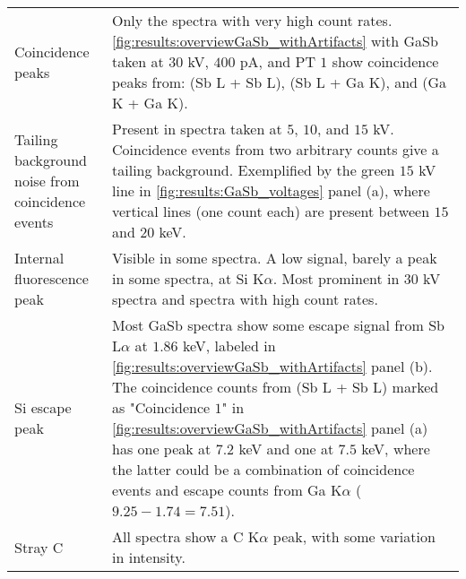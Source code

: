 \begin{table}[phtb]
\begin{center}
\begin{tabular}{p{3.5cm}p{11.1cm}}
			Coincidence peaks                                & Only the spectra with very high count rates. \cref{fig:results:overviewGaSb_withArtifacts} with GaSb taken at $30$ kV, $400$ pA, and PT $1$ show coincidence peaks from: (Sb L + Sb L), (Sb L + Ga K), and (Ga K + Ga K).                                                                                                                                                                                                                                 \\
			Tailing background noise from coincidence events & Present in spectra taken at $5$, $10$, and $15$ kV. Coincidence events from two arbitrary counts give a tailing background. Exemplified by the green $15$ kV line in \cref{fig:results:GaSb_voltages} panel (a), where vertical lines (one count each) are present between $15$ and $20$ keV.                                                                                                                                                             \\
			Internal fluorescence peak                       & Visible in some spectra. A low signal, barely a peak in some spectra, at Si K$\alpha$. Most prominent in $30$ kV spectra and spectra with high count rates.                                                                                                                                                                                                                                                                                               \\
			Si escape peak                                   & Most GaSb spectra show some escape signal from Sb L$\alpha$ at $1.86$ keV, labeled in \cref{fig:results:overviewGaSb_withArtifacts} panel (b). The coincidence counts from (Sb L + Sb L) marked as "Coincidence $1$" in \cref{fig:results:overviewGaSb_withArtifacts} panel (a) has one peak at $7.2$ keV and one at $7.5$ keV, where the latter could be a combination of coincidence events and escape counts from Ga K$\alpha$ ($9.25 - 1.74 = 7.51$). \\
			Stray C                                          & All spectra show a C K$\alpha$ peak, with some variation in intensity.                                                                                                                                                                                                                                                                                                                                                                                    \\

\end{tabular}
\end{center}
\end{table}
